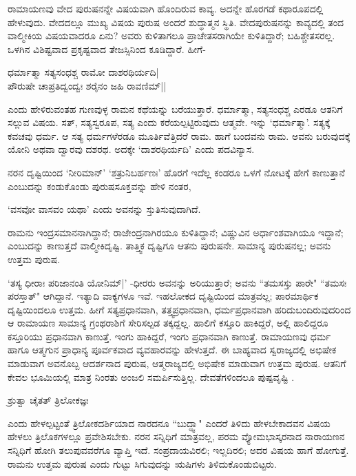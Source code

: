 ರಾಮಾಯಣವು ವೇದ ಪುರುಷನನ್ನೇ ವಿಷಯವಾಗಿ ಹೊಂದಿರುವ ಕಾವ್ಯ. ಅದನ್ನೇ ಹೊರಗಡೆ ಕಥಾರೂಪದಲ್ಲಿ ಹೇಳುವುದು. ವೇದದಲ್ಲೂ ಮುಖ್ಯ ವಿಷಯ ಪುರುಷ ಅಂದರೆ ಶುದ್ಧಾತ್ಮನ ಸ್ಥಿತಿ. ವೇದಪುರುಷನನ್ನು ಕಾವ್ಯದಲ್ಲಿ ತಂದ ವಾಲ್ಮೀಕಿಯ ವಿಷಯವಾದರೂ ಏನು? ಅವರು ಕುಳಿತಾಗಲೂ ಪ್ರಾಚೇತಸರಾಗಿಯೇ ಕುಳಿತಿದ್ದಾರೆ; ಬಹಿಶ್ಚೇತಸರಲ್ಲ. ಒಳಗಿನ ವಿಶಿಷ್ಟವಾದ ಪ್ರಕೃಷ್ಟವಾದ ತೇಜಸ್ಸಿನಿಂದ ಕೂಡಿದ್ದಾರೆ. ಹೀಗೆ-

\begin{shloka}
ಧರ್ಮಾತ್ಮಾ ಸತ್ಯಸಂಧಶ್ಚ ರಾಮೋ ದಾಶರಥಿರ್ಯದಿ|\label{250a}\\
ಪೌರುಷೇ ಚಾಪ್ರತಿದ್ವಂದ್ವಃ ಶರೈನಂ ಜಹಿ ರಾವಣಿಮ್||
\end{shloka}

ಎಂದು ಹೇಳಿರುವಂತಹ ಗುಣವುಳ್ಳ ರಾಮನ ಕಥೆಯನ್ನು ಬರೆಯುತ್ತಾರೆ. ಧರ್ಮಾತ್ಮಾ, ಸತ್ಯಸಂಧಶ್ಚ ಎರಡೂ ಆತನಿಗೆ ಸಲ್ಲುವ ವಿಷಯ. ಸತ್, ಸತ್ಯಸ್ವರೂಪ, ಸತ್ಯ ಎಂದು ಕರೆಯಲ್ಪಟ್ಟಿರುವುದು ಆತ್ಮವೇ. ಇನ್ನು `ಧರ್ಮಾತ್ಮಾ'. ಸತ್ಯಕ್ಕೆ ಕವಚವು ಧರ್ಮ.  ಆ ಸತ್ಯ ಧರ್ಮಗಳೆರಡೂ ಮೂರ್ತಿವೆತ್ತಿದರೆ ರಾಮ. ಹಾಗೆ ಬಂದವನು ರಾಮ. ಅವನು ಬರುವುದಕ್ಕೆ ಯೋನಿ ಅಥವಾ ದ್ವಾರವು ದಶರಥ. ಅದಕ್ಕೇ `ದಾಶರಥಿರ್ಯದಿ' ಎಂದು ಪದವಿನ್ಯಾಸ. 

ನರನ ದೃಷ್ಟಿಯಿಂದ `ನೀರಿಮಾನ್' `ಶತ್ರುನಿಬರ್ಹಣಃ' ಹೊರಗೆ ಇದೆಲ್ಲ ಕಂಡರೂ ಒಳಗೆ ನೋಟಕ್ಕೆ ಹೇಗೆ ಕಾಣುತ್ತಾನೆ ಎಂಬುದನ್ನು ಕಂಡುಕೊಂಡು ಪುರುಷಸೂಕ್ತವನ್ನು ಹೇಳಿ ನಂತರ, 

\begin{shloka}
`ವಸವೋ ವಾಸವಂ ಯಥಾ' ಎಂದು ಅವನನ್ನು ಸ್ತುತಿಸುವುದಾಗಿದೆ.
\end{shloka}

ರಾಮನು ಇಂದ್ರಸಮಾನನಾಗಿದ್ದಾನೆ; ರಾಜೇಂದ್ರನಾಗಿರಯೂ ಕುಳಿತಿದ್ದಾನೆ; ವಿಷ್ಣುವಿನ ಅರ್ಧಾಂಶವಾಗಿಯೂ ಇದ್ದಾನೆ; ಎಂಬುದನ್ನು ಕಾಣುತ್ತದೆ ವಾಲ್ಮೀಕಿದೃಷ್ಟಿ. ತಾತ್ತ್ವಿಕ ದೃಷ್ಟಿಗೂ ಆತನು ಪುರುಷನೇ. ಸಾಮಾನ್ಯ ಪುರುಷನಲ್ಲ; ಅವನು ಉತ್ತಮ ಪುರುಷ. 

`ತಸ್ಯ ಧೀರಾಃ ಪರಿಜಾನಂತಿ ಯೋನಿಮ್|' -ಧೀರರು ಅವನನ್ನು ಅರಿಯುತ್ತಾರೆ; ಅವನು ``ತಮಸಸ್ತು ಪಾರೇ" ``ತಮಸಃ ಪರಸ್ತಾತ್"\label{251} ಆಗಿದ್ದಾನೆ. ಇತ್ಯಾದಿ ವಾಕ್ಯಗಳೂ ಇವೆ. ಇಹಲೋಕದ ದೃಷ್ಟಿಯಿಂದ ಮಾತ್ರವಲ್ಲ; ಪಾರಮಾರ್ಥಿಕ ದೃಷ್ಟಿಯಿಂದಲೂ ಉತ್ತಮ. ಹೀಗೆ ಸತ್ಯಪ್ರಧಾನವಾಗಿ, ತತ್ತ್ವಪ್ರಧಾನವಾಗಿ, ಧರ್ಮಪ್ರಧಾನವಾಗಿ ಹರಿದುಬಂದಿರುವುದರಿಂದ ಆ ರಾಮಾಯಣ ಸಾಮಾನ್ಯ ಗ್ರಂಥರಾಶಿಗೆ ಸೇರಿಸಲ್ಪಡ ತಕ್ಕದ್ದಲ್ಲ. ಹಾಲಿಗೆ ಕಸ್ತೂರಿ ಹಾಕಿದ್ದರೆ, ಅಲ್ಲಿ ಹಾಲಿದ್ದರೂ ಕಸ್ತೂರಿಯು ಪ್ರಧಾನವಾಗಿ ಕಾಣುತ್ತೆ. ಇಂಗು ಹಾಕಿದ್ದರೆ, ಇಂಗು ಪ್ರಧಾನವಾಗಿ ಕಾಣುತ್ತೆ. ರಾಮಾಯಣವು ಧರ್ಮ ಹಾಗೂ ಆತ್ಮಗುನ ಪ್ರಾಧಾನ್ಯ ಪೂರ್ವಕವಾದ ವ್ಯವಹಾರವನ್ನು ಹೇಳುತ್ತದೆ. ಈ ಬಾಹ್ಯವಾದ ಸ್ವರಾಜ್ಯದಲ್ಲಿ ಅಭಿಷೇಕ ಮಾಡುವಾಗ ಅವನೊಬ್ಬ ಆದರ್ಶನಾದ ಪುರುಷ, ಆತ್ಮರಾಜ್ಯದಲ್ಲಿ ಅಭಿಷೇಕ ಮಾಡುವಾಗ ಉತ್ತಮ ಪುರುಷ. ಆತನಿಗೆ ಕೇವಲ ಭೂಮಿಯಲ್ಲಿ ಮಾತ್ರ ನಿಂರತು ಅಂಜಲಿ ಸಮರ್ಪಿಸುತ್ತಿಲ್ಲ. ದೇವತೆಗಳಿಂದಲೂ ಪುಷ್ಪವೃಷ್ಟಿ .

\begin{shloka}
ಶ್ರುತ್ವಾ ಚೈತತ್ ತ್ರಿಲೋಕಜ್ಞಃ
\end{shloka}
ಎಂದು ಹೇಳಲ್ಪಟ್ಟಂತೆ ತ್ರಿಲೋಕದರ್ಶಿಯಾದ ನಾರದನೂ ``ಬುದ್ಧ್ವಾ" ಎಂದರೆ ತಿಳಿದು ಹೇಳಬೇಕಾದವನ ವಿಷಯ ಹೇಳಲು ತ್ರಿಲೊಕಗಳಲ್ಲೂ ಪ್ರವೇಶಿಸಬೇಕು. ನರನ ಸನ್ನಿಧಿಗೆ ಮಾತ್ರವಲ್ಲ, ಪರಮ ವ್ಯೋಮಭಾಸ್ಕರನಾದ ನಾರಾಯಣನ ಸನ್ನಿಧಿಗೆ ಹೋಗಿ ತಲುಪುವವರೆಗೂ ವ್ಯಾಪ್ತಿ ಇದೆ. ಸಂಪ್ರದಾಯವಿರಲಿ; ಇಲ್ಲದಿರಲಿ; ಅದರ ವಿಷಯ ಹಾಗೆ ಹೋಗುತ್ತೆ. ರಾಮನು ಉತ್ತಮ ಪುರುಷ ಎಂದು ಗುಟ್ಟು ಸಿಗುವುದನ್ನು ಋಷಿಗಳು ತಿಳಿದುಕೊಂಡುಬಿಟ್ಟರು.

